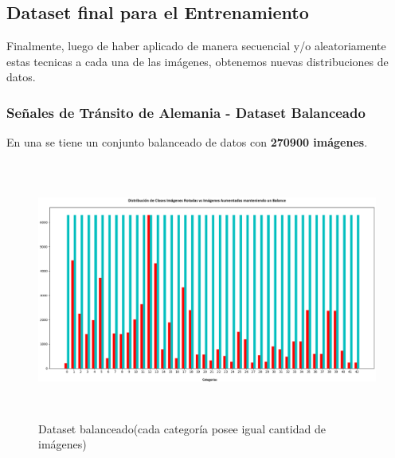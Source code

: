 	\newpage
	\subsection{Dataset final para el Entrenamiento}
		Finalmente, luego de haber aplicado de manera secuencial y/o aleatoriamente estas tecnicas a cada una de las imágenes, obtenemos nuevas distribuciones de datos. 
		\subsubsection{Señales de Tránsito de Alemania - Dataset Balanceado }
			En una se tiene un conjunto balanceado de datos con {\bf 270900 imágenes}.
			\begin{figure}[H]
				\includegraphics[width=1\textwidth, height=8.5cm]{images/desarrollo/histograms/train_extended_balanced270900}
				\begin{center}
				\caption{\small{Dataset balanceado(cada categoría posee igual cantidad de imágenes)}}
				{\small{\fontsize{10}{16.8}\selectfont {Fuente: Elaboración propia}}}
				\end{center}

			\end{figure}

